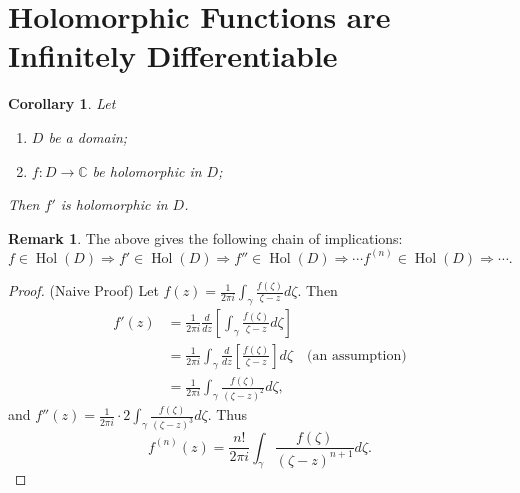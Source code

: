 \documentclass[12pt,openany]{book}
\newtheorem{corollary}{Corollary}[theorem]
\theoremstyle{definition}
\newtheorem{remark}{Remark}[section]
\newcommand{\C}{\mathbb{C}}
\newcommand{\of}[1]{\left( #1 \right)}
\newcommand{\Hol}{\operatorname{Hol}}
\begin{document}
	\section{Holomorphic Functions are Infinitely Differentiable}
	\begin{tcolorbox}[colback=white,colframe=corcolor,arc=5pt,title={\color{white}\bf }]
		\begin{corollary}
			Let \begin{enumerate}[(1)]
				\item $D$ be a domain;
				\item $f:D\to\C$ be holomorphic in $D$;
			\end{enumerate} Then $f'$ is holomorphic in $D$.
		\end{corollary}
	\end{tcolorbox}
	\begin{remark}
		The above gives the following chain of implications: \[
		\boxed{f\in\Hol\of{D}}\Rightarrow\boxed{f'\in\Hol\of{D}}\Rightarrow\boxed{f''\in\Hol\of{D}}\Rightarrow\cdots\boxed{f^{\of{n}}\in\Hol\of{D}}\Rightarrow\cdots.
		\]
	\end{remark}
	\begin{proof}
		(Naive Proof) Let $\displaystyle f\of{z}=\frac{1}{2\pi i}\int_\gamma\frac{f\of{\zeta}}{\zeta-z}d\zeta$. Then \begin{align*}
			f'\of{z}&=\frac{1}{2\pi i}\frac{d}{dz}\left[\int_\gamma\frac{f\of{\zeta}}{\zeta-z}d\zeta\right]\\
			&=\frac{1}{2\pi i}\int_\gamma\frac{d}{dz}\left[\frac{f\of{\zeta}}{\zeta-z}\right]d\zeta\quad\text{(an assumption)}\\
			&=\frac{1}{2\pi i}\int_\gamma\frac{f\of{\zeta}}{\of{\zeta-z}^2}d\zeta,
		\end{align*} and $f''\of{z}=\displaystyle\frac{1}{2\pi i}\cdot 2\int_\gamma\frac{f\of{\zeta}}{\of{\zeta-z}^3}d\zeta$. Thus \[
		f^{\of{n}}\of{z}=\frac{n!}{2\pi i}\int_\gamma\frac{f\of{\zeta}}{\of{\zeta-z}^{n+1}}d\zeta.
		\]
	\end{proof}
	
	\newpage
\end{document}
